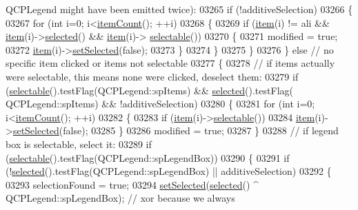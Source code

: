 \begin{DoxyCode}
{       QCPLegend might have been emitted twice):}
03265       \textcolor{keywordflow}{if} (!additiveSelection)
03266       \{
03267         \textcolor{keywordflow}{for} (\textcolor{keywordtype}{int} i=0; i<\hyperlink{a00045_a198228e9cdc78d3a3c306fa6763d0404}{itemCount}(); ++i)
03268         \{
03269           \textcolor{keywordflow}{if} (\hyperlink{a00045_a454272d7094437beb3278a2294006da5}{item}(i) != ali && \hyperlink{a00045_a454272d7094437beb3278a2294006da5}{item}(i)->\hyperlink{a00023_ac776e68e3367704452131c6aa9908bb9}{selected}() && \hyperlink{a00045_a454272d7094437beb3278a2294006da5}{item}(i)->
      \hyperlink{a00023_a0a0205f33f37edae50826c24cb8f1983}{selectable}())
03270           \{
03271             modified = \textcolor{keyword}{true};
03272             \hyperlink{a00045_a454272d7094437beb3278a2294006da5}{item}(i)->\hyperlink{a00023_a6eed93b0ab99cb3eabb043fb08179c2b}{setSelected}(\textcolor{keyword}{false});
03273           \}
03274         \}
03275       \}
03276     \} \textcolor{keywordflow}{else} \textcolor{comment}{// no specific item clicked or items not selectable}
03277     \{
03278       \textcolor{comment}{// if items actually were selectable, this means none were clicked, deselect them:}
03279       \textcolor{keywordflow}{if} (\hyperlink{a00045_a459f39581d1eba9ee80557837601e21c}{selectable}().testFlag(QCPLegend::spItems) && \hyperlink{a00045_a10948e896935ad14f374e6f712afaae9}{selected}().testFlag(
      QCPLegend::spItems) && !additiveSelection)
03280       \{
03281         \textcolor{keywordflow}{for} (\textcolor{keywordtype}{int} i=0; i<\hyperlink{a00045_a198228e9cdc78d3a3c306fa6763d0404}{itemCount}(); ++i)
03282         \{
03283           \textcolor{keywordflow}{if} (\hyperlink{a00045_a454272d7094437beb3278a2294006da5}{item}(i)->\hyperlink{a00023_a0a0205f33f37edae50826c24cb8f1983}{selectable}())
03284             \hyperlink{a00045_a454272d7094437beb3278a2294006da5}{item}(i)->\hyperlink{a00023_a6eed93b0ab99cb3eabb043fb08179c2b}{setSelected}(\textcolor{keyword}{false});
03285         \}
03286         modified = \textcolor{keyword}{true};
03287       \}
03288       \textcolor{comment}{// if legend box is selectable, select it:}
03289       \textcolor{keywordflow}{if} (\hyperlink{a00045_a459f39581d1eba9ee80557837601e21c}{selectable}().testFlag(QCPLegend::spLegendBox))
03290       \{
03291         \textcolor{keywordflow}{if} (!\hyperlink{a00045_a10948e896935ad14f374e6f712afaae9}{selected}().testFlag(QCPLegend::spLegendBox) || additiveSelection)
03292         \{
03293           selectionFound = \textcolor{keyword}{true};
03294           \hyperlink{a00045_a752c48b30f8ba870b55e79659385f107}{setSelected}(\hyperlink{a00045_a10948e896935ad14f374e6f712afaae9}{selected}() ^ QCPLegend::spLegendBox); \textcolor{comment}{// xor because we always
}
\end{DoxyCode}
